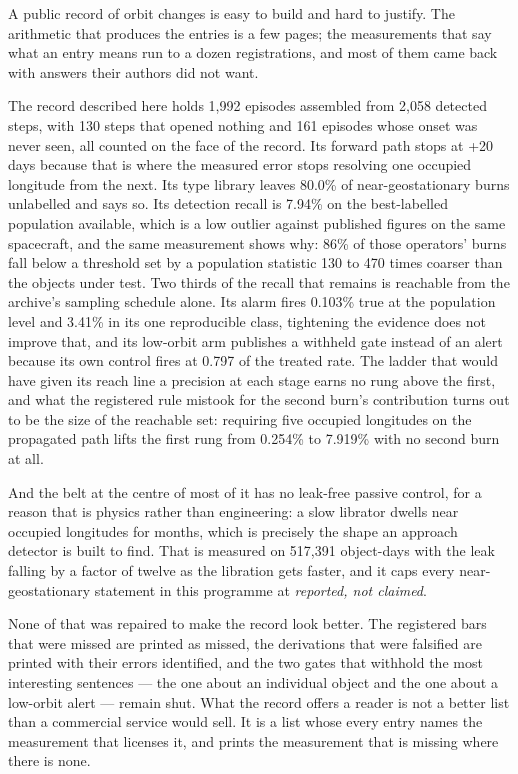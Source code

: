 \documentclass[11pt]{article}
\begin{document}
A public record of orbit changes is easy to build and hard to justify. The arithmetic that produces the entries is a few pages; the measurements that say what an entry means run to a dozen registrations, and most of them came back with answers their authors did not want.

The record described here holds 1,992 episodes assembled from 2,058 detected steps, with 130 steps that opened nothing and 161 episodes whose onset was never seen, all counted on the face of the record. Its forward path stops at +20 days because that is where the measured error stops resolving one occupied longitude from the next. Its type library leaves 80.0\% of near-geostationary burns unlabelled and says so. Its detection recall is 7.94\% on the best-labelled population available, which is a low outlier against published figures on the same spacecraft, and the same measurement shows why: 86\% of those operators' burns fall below a threshold set by a population statistic 130 to 470 times coarser than the objects under test. Two thirds of the recall that remains is reachable from the archive's sampling schedule alone. Its alarm fires 0.103\% true at the population level and 3.41\% in its one reproducible class, tightening the evidence does not improve that, and its low-orbit arm publishes a withheld gate instead of an alert because its own control fires at 0.797 of the treated rate. The ladder that would have given its reach line a precision at each stage earns no rung above the first, and what the registered rule mistook for the second burn's contribution turns out to be the size of the reachable set: requiring five occupied longitudes on the propagated path lifts the first rung from 0.254\% to 7.919\% with no second burn at all.

And the belt at the centre of most of it has no leak-free passive control, for a reason that is physics rather than engineering: a slow librator dwells near occupied longitudes for months, which is precisely the shape an approach detector is built to find. That is measured on 517,391 object-days with the leak falling by a factor of twelve as the libration gets faster, and it caps every near-geostationary statement in this programme at \emph{reported, not claimed}.

None of that was repaired to make the record look better. The registered bars that were missed are printed as missed, the derivations that were falsified are printed with their errors identified, and the two gates that withhold the most interesting sentences --- the one about an individual object and the one about a low-orbit alert --- remain shut. What the record offers a reader is not a better list than a commercial service would sell. It is a list whose every entry names the measurement that licenses it, and prints the measurement that is missing where there is none.
\end{document}
